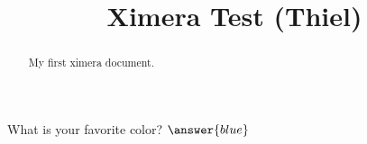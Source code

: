 \documentclass{ximera}
\title{Ximera Test (Thiel)}
\begin{document}
\begin{abstract}
My first ximera document.
\end{abstract}
\maketitle

What is your favorite color? $\answer{blue}$

\end{document}

